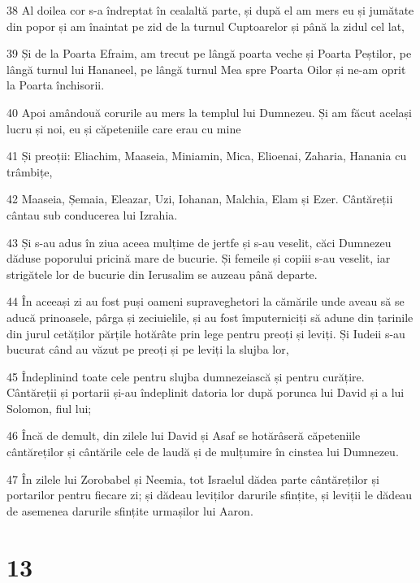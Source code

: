 \par 38 Al doilea cor s-a îndreptat în cealaltă parte, și după el am mers eu și jumătate din popor și am înaintat pe zid de la turnul Cuptoarelor și până la zidul cel lat,
\par 39 Și de la Poarta Efraim, am trecut pe lângă poarta veche și Poarta Peștilor, pe lângă turnul lui Hananeel, pe lângă turnul Mea spre Poarta Oilor și ne-am oprit la Poarta închisorii.
\par 40 Apoi amândouă corurile au mers la templul lui Dumnezeu. Și am făcut același lucru și noi, eu și căpeteniile care erau cu mine
\par 41 Și preoții: Eliachim, Maaseia, Miniamin, Mica, Elioenai, Zaharia, Hanania cu trâmbițe,
\par 42 Maaseia, Șemaia, Eleazar, Uzi, Iohanan, Malchia, Elam și Ezer. Cântăreții cântau sub conducerea lui Izrahia.
\par 43 Și s-au adus în ziua aceea mulțime de jertfe și s-au veselit, căci Dumnezeu dăduse poporului pricină mare de bucurie. Și femeile și copiii s-au veselit, iar strigătele lor de bucurie din Ierusalim se auzeau până departe.
\par 44 În aceeași zi au fost puși oameni supraveghetori la cămările unde aveau să se aducă prinoasele, pârga și zeciuielile, și au fost împuterniciți să adune din țarinile din jurul cetăților părțile hotărâte prin lege pentru preoți și leviți. Și Iudeii s-au bucurat când au văzut pe preoți și pe leviți la slujba lor,
\par 45 Îndeplinind toate cele pentru slujba dumnezeiască și pentru curățire. Cântăreții și portarii și-au îndeplinit datoria lor după porunca lui David și a lui Solomon, fiul lui;
\par 46 Încă de demult, din zilele lui David și Asaf se hotărâseră căpeteniile cântăreților și cântările cele de laudă și de mulțumire în cinstea lui Dumnezeu.
\par 47 În zilele lui Zorobabel și Neemia, tot Israelul dădea parte cântăreților și portarilor pentru fiecare zi; și dădeau leviților darurile sfințite, și leviții le dădeau de asemenea darurile sfințite urmașilor lui Aaron.

\chapter{13}

